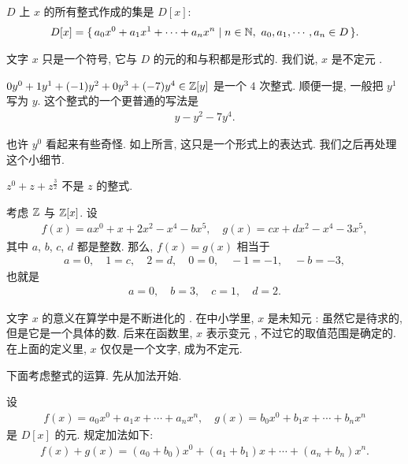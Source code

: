 \begin{definition}
    $D$ 上 $x$ 的所有整式作成的集是 $D[x]$:
    \begin{align*}
        D[x] = \{\, a_0 x^0 + a_1 x^1 + \cdots + a_n x^n \mid n \in \mathbb{N},\ a_0,a_1,\cdots,a_n \in D \,\}.
    \end{align*}

    文字 $x$ 只是一个符号, 它与 $D$ 的元的和与积都是形式的. 我们说, $x$ 是不定元 .
\end{definition}

\begin{example}
    $0y^0 + 1y^1 + (-1)y^2 + 0y^3 + (-7)y^4 \in \mathbb{Z}[y]$ 是一个 $4$ 次整式. 顺便一提, 一般把 $y^1$ 写为 $y$. 这个整式的一个更普通的写法是
    \begin{align*}
        y - y^2 - 7y^4.
    \end{align*}

    也许 $y^0$ 看起来有些奇怪. 如上所言, 这只是一个形式上的表达式. 我们之后再处理这个小细节.
\end{example}

\begin{example}
    $z^0 + z + z^{\frac{3}{2}}$ 不是 $z$ 的整式.
\end{example}

\begin{example}
    考虑 $\mathbb{Z}$ 与 $\mathbb{Z}[x]$. 设
    \begin{align*}
        f(x) = ax^0 + x + 2x^2 - x^4 - bx^5, \quad g(x) = cx + dx^2 - x^4 - 3x^5,
    \end{align*}
    其中 $a$, $b$, $c$, $d$ 都是整数. 那么, $f(x) = g(x)$ 相当于
    \begin{align*}
        a = 0, \quad 1 = c, \quad 2 = d, \quad 0 = 0, \quad -1 = -1, \quad -b = -3,
    \end{align*}
    也就是
    \begin{align*}
        a = 0, \quad b = 3, \quad c = 1, \quad d = 2.
    \end{align*}
\end{example}

\begin{remark}
    文字 $x$ 的意义在算学中是不断进化的 . 在中小学里, $x$ 是未知元 : 虽然它是待求的, 但是它是一个具体的数. 后来在函数里, $x$ 表示变元 , 不过它的取值范围是确定的. 在上面的定义里, $x$ 仅仅是一个文字, 成为不定元.
\end{remark}

下面考虑整式的运算. 先从加法开始.

\begin{definition}
    设
    \begin{align*}
        f(x) = a_0 x^0 + a_1 x + \cdots + a_n x^n, \quad g(x) = b_0 x^0 + b_1 x + \cdots + b_n x^n
    \end{align*}
    是 $D[x]$ 的元. 规定加法如下:
    \begin{align*}
        f(x) + g(x) = (a_0 + b_0) x^0 + (a_1 + b_1) x + \cdots + (a_n + b_n) x^n.
    \end{align*}
\end{definition}

